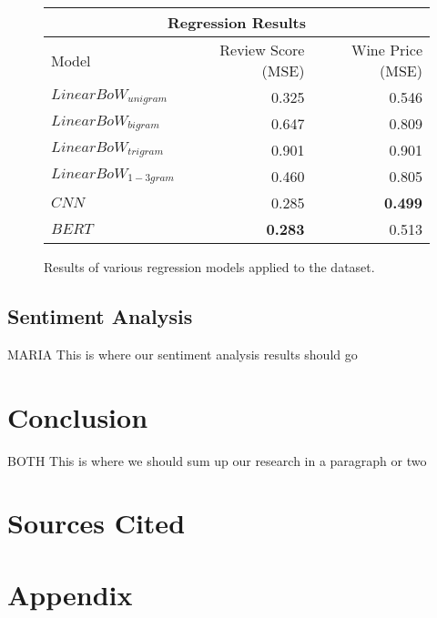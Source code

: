 \documentclass[11pt,english]{article}
\begin{document}
    \begin{figure}
    \centering
    \begin{tabular}{ |l||r|r|  }
        \hline
        \multicolumn{3}{|c|}{Regression Results} \\
        \hline
        Model& Review Score (MSE) & Wine Price (MSE) \\
        \hline
        $Linear BoW_{unigram}$   & 0.325          & 0.546 \\
        $Linear BoW_{bigram}$    & 0.647          & 0.809 \\
        $Linear BoW_{trigram}$   & 0.901          & 0.901 \\
        $Linear BoW_{1-3gram}$   & 0.460          & 0.805 \\
        \hline
        $CNN$                    & 0.285          & \textbf{0.499} \\
        \hline
        $BERT$                   & \textbf{0.283} & 0.513 \\
        \hline
    \end{tabular}
    \caption{ Results of various regression models applied to the dataset. }
    \label{regression_results}
    \end{figure}

\subsection{Sentiment Analysis}
    MARIA
    This is where our sentiment analysis results should go

\section{Conclusion}
    BOTH
    This is where we should sum up our research in a paragraph or two

\section {Sources Cited}



\newpage
\section{Appendix}
\end{document}
